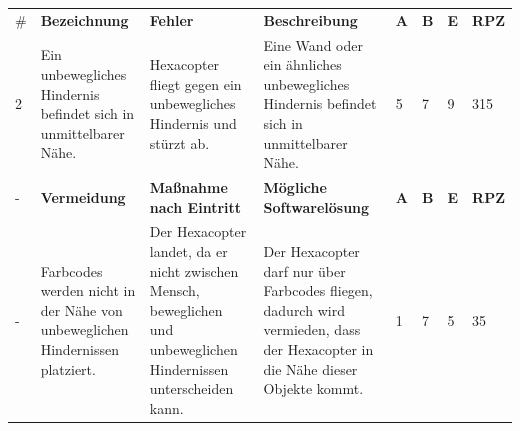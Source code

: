\begin{longtable}{|p{0.4cm}|p{3.0cm}|p{3.1cm}|p{3.1cm}|p{0.4cm}|p{0.4cm}|p{0.4cm}|p{0.8cm}|}
\hline \#   & \textbf{Bezeichnung}                                                                                               & \textbf{Fehler}                                                                                                                & \textbf{Beschreibung}                                                                                                                    & \textbf{A}   & \textbf{B}   & \textbf{E}   & \textbf{RPZ} \\
 2          & Ein unbewegliches Hindernis befindet sich in unmittelbarer Nähe.                                          & Hexacopter fliegt gegen ein unbewegliches Hindernis und stürzt ab.                                                    & Eine Wand oder ein ähnliches unbewegliches Hindernis befindet sich in unmittelbarer Nähe.                                       & 5   & 7   & 9   & 315 \\
\hline -    & \textbf{Vermeidung}                                                                                                & \textbf{Maßnahme nach Eintritt}                                                                                                & \textbf{Mögliche Softwarelösung}                                                                                                         & \textbf{A}   & \textbf{B}   & \textbf{E}   & \textbf{RPZ} \\
 -          & Farbcodes werden nicht in der Nähe von unbeweglichen Hindernissen platziert.                              & Der Hexacopter landet, da er nicht zwischen Mensch, beweglichen und unbeweglichen Hindernissen unterscheiden kann.    & Der Hexacopter darf nur über Farbcodes fliegen, dadurch wird vermieden, dass der Hexacopter in die Nähe dieser Objekte kommt.   & 1   & 7   & 5   & 35  \\\hline


\end{longtable}
